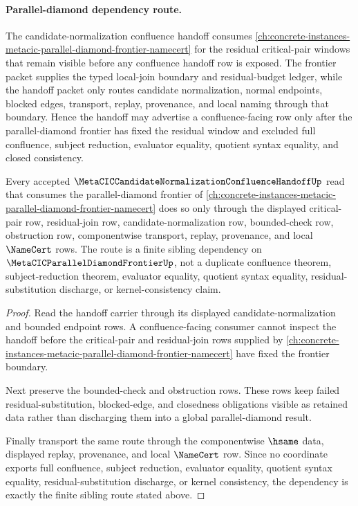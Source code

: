 \paragraph{Parallel-diamond dependency route.}
The candidate-normalization confluence handoff consumes \autoref{ch:concrete-instances-metacic-parallel-diamond-frontier-namecert} for the residual critical-pair windows that remain visible before any confluence handoff row is exposed. The frontier packet supplies the typed local-join boundary and residual-budget ledger, while the handoff packet only routes candidate normalization, normal endpoints, blocked edges, transport, replay, provenance, and local naming through that boundary. Hence the handoff may advertise a confluence-facing row only after the parallel-diamond frontier has fixed the residual window and excluded full confluence, subject reduction, evaluator equality, quotient syntax equality, and closed consistency.

\begin{theorem}
\label{thm:metacic-candidate-normalization-confluence-handoff-parallel-diamond-dependency}
Every accepted $\MetaCICCandidateNormalizationConfluenceHandoffUp$ read that consumes the parallel-diamond frontier of \autoref{ch:concrete-instances-metacic-parallel-diamond-frontier-namecert} does so only through the displayed critical-pair row, residual-join row, candidate-normalization row, bounded-check row, obstruction row, componentwise transport, replay, provenance, and local $\NameCert$ rows. The route is a finite sibling dependency on $\MetaCICParallelDiamondFrontierUp$, not a duplicate confluence theorem, subject-reduction theorem, evaluator equality, quotient syntax equality, residual-substitution discharge, or kernel-consistency claim.
\end{theorem}
\begin{proof}
Read the handoff carrier through its displayed candidate-normalization and bounded endpoint rows. A confluence-facing consumer cannot inspect the handoff before the critical-pair and residual-join rows supplied by \autoref{ch:concrete-instances-metacic-parallel-diamond-frontier-namecert} have fixed the frontier boundary.

Next preserve the bounded-check and obstruction rows. These rows keep failed residual-substitution, blocked-edge, and closedness obligations visible as retained data rather than discharging them into a global parallel-diamond result.

Finally transport the same route through the componentwise $\hsame$ data, displayed replay, provenance, and local $\NameCert$ row. Since no coordinate exports full confluence, subject reduction, evaluator equality, quotient syntax equality, residual-substitution discharge, or kernel consistency, the dependency is exactly the finite sibling route stated above.
\end{proof}
